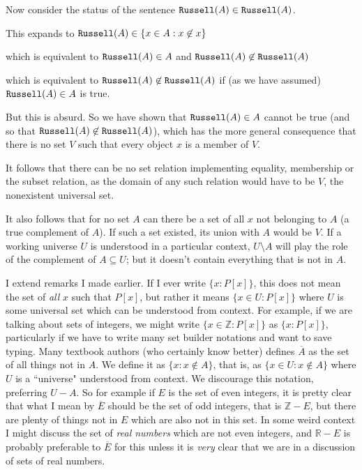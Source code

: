 \documentclass[12pt]{article}
\begin{document}
\begin{description}
Now consider the status of the sentence ${\tt Russell}(A) \in {\tt Russell}(A)$.

This expands to ${\tt Russell}(A) \in \{x \in A:x \not\in x\}$

which is equivalent to ${\tt Russell}(A) \in A$ and ${\tt Russell}(A) \not\in {\tt Russell}(A)$

which is equivalent to ${\tt Russell}(A) \not\in {\tt Russell}(A)$ if (as we have assumed) ${\tt Russell}(A)\in A$ is true.

But this is absurd.  So we have shown that ${\tt Russell}(A)\in A$  cannot be true (and so that ${\tt Russell}(A) \not\in {\tt Russell}(A)$), which has the more general consequence
that there is no set $V$ such that every object $x$ is a member of $V$.

It follows that there can be no set relation implementing equality, membership or the subset relation, as the domain of any such relation would have to be $V$, the nonexistent universal set.

It also follows that for no set $A$ can there be a set of all $x$ not belonging to $A$ (a true complement of $A$).
If such a set existed, its union with $A$ would be $V$.  If a working universe $U$ is understood in a particular context,
$U \setminus A$ will play the role of the complement of $A \subseteq U$;  but it doesn't contain everything that is not in $A$.


I extend remarks I made earlier.  If I ever write $\{x:P[x]\}$, this does not mean the set of {\em all\/} $x$ such that $P[x]$, but rather it means $\{x\in U:P[x]\}$  where $U$ is some universal set which can be understood from context.  For example, if we are talking about sets of integers, we might write $\{x\in \mathbb Z:P[x]\}$ as $\{x:P[x]\}$, particularly if we have to write many set builder notations and want to save typing.
Many textbook authors (who certainly know better) defines $\overline{A}$ as the set of all things not in $A$.  We define it as $\{x:x \not\in A\}$, that is, as $\{x\in U:x \not\in A\}$ where $U$ is a ``universe" understood from context.
We discourage this notation, preferring $U - A$.  So for example if $E$ is the set of even integers, it is pretty clear that what I mean by $\overline{E}$ should be the set of odd integers, that is $\mathbb Z - E$, but there are plenty of things not in $E$ which are also not in this set.  In some weird context I might discuss the set of {\em real numbers\/} which are not even integers, and $\mathbb R - E$ is probably preferable to $\overline{E}$ for this unless it is {\em very\/} clear that we are in a discussion of sets of real numbers.



\end{description}
\end{document}
